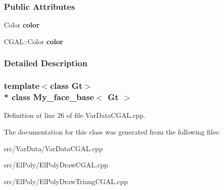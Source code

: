 \subsubsection*{Public Attributes}
\begin{DoxyCompactItemize}
\item 
Color {\bfseries color}\hypertarget{classMy__face__base_aefc38372916d172f9b1ef5bd996a1718}{}\label{classMy__face__base_aefc38372916d172f9b1ef5bd996a1718}

\item 
C\+G\+A\+L\+::\+Color {\bfseries color}\hypertarget{classMy__face__base_aefc38372916d172f9b1ef5bd996a1718}{}\label{classMy__face__base_aefc38372916d172f9b1ef5bd996a1718}

\end{DoxyCompactItemize}


\subsubsection{Detailed Description}
\subsubsection*{template$<$class Gt$>$\\*
class My\+\_\+face\+\_\+base$<$ Gt $>$}



Definition at line 26 of file Var\+Data\+C\+G\+A\+L.\+cpp.



The documentation for this class was generated from the following files\+:\begin{DoxyCompactItemize}
\item 
src/\+Var\+Data/Var\+Data\+C\+G\+A\+L.\+cpp\item 
src/\+El\+Poly/El\+Poly\+Draw\+C\+G\+A\+L.\+cpp\item 
src/\+El\+Poly/El\+Poly\+Draw\+Triang\+C\+G\+A\+L.\+cpp\end{DoxyCompactItemize}

